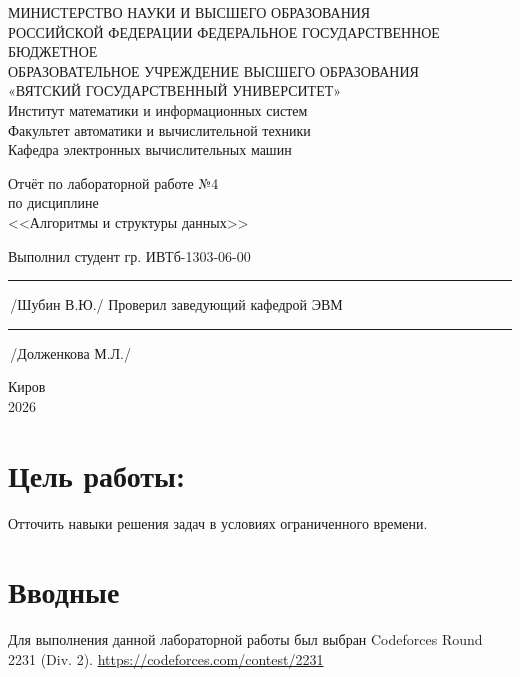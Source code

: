 \documentclass[oneside,a4paper,14pt]{extarticle} %
\begin{document}
	\newpage\thispagestyle{empty}
	\begin{center}
		МИНИСТЕРСТВО НАУКИ И ВЫСШЕГО ОБРАЗОВАНИЯ\\
		РОССИЙСКОЙ ФЕДЕРАЦИИ
		ФЕДЕРАЛЬНОЕ ГОСУДАРСТВЕННОЕ БЮДЖЕТНОЕ\\
		ОБРАЗОВАТЕЛЬНОЕ
		УЧРЕЖДЕНИЕ ВЫСШЕГО ОБРАЗОВАНИЯ\\
		«ВЯТСКИЙ ГОСУДАРСТВЕННЫЙ УНИВЕРСИТЕТ»\\
		Институт математики и информационных систем\\
		Факультет автоматики и вычислительной техники\\
		Кафедра электронных вычислительных машин
	\end{center}
	\vspace{20mm}
	
	\begin{center}
		Отчёт по лабораторной работе №4\\
		по дисциплине\\
		<<Алгоритмы и структуры данных>>\\
	\end{center}
	\vspace{48mm}
	
	\noindent
	Выполнил студент гр. ИВТб-1303-06-00 \hfill \rule[-0,5mm]{30mm}{0.15mm}\,/Шубин В.Ю./
	\newline
	Проверил заведующий кафедрой ЭВМ \hfill \rule[-0,5mm]{30mm}{0.15mm}\,/Долженкова М.Л./
	
	\vfill
	\begin{center}
		Киров\\
		2026
	\end{center}
	
	\newpage
	
	\section*{Цель работы:}
	Отточить навыки решения задач в условиях ограниченного времени.
	
	\section*{Вводные}
	Для выполнения данной лабораторной работы был выбран Codeforces Round 2231 (Div. 2). 
	\url{https://codeforces.com/contest/2231}
	
\end{document}
